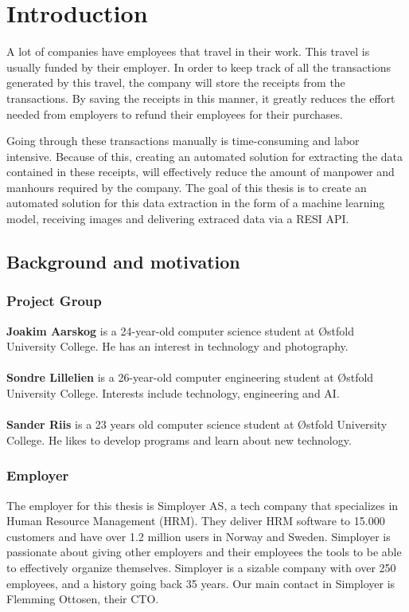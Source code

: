  \chapter{Introduction}
\label{ch:intro}
A lot of companies have employees that travel in their work.
This travel is usually funded by their employer.
In order to keep track of all the transactions generated by this travel, the company will store the receipts from the
transactions.
By saving the receipts in this manner, it greatly reduces the effort needed from employers to refund their employees
for their purchases.

Going through these transactions manually is time-consuming and labor intensive.
Because of this, creating an automated solution for extracting the data contained in these receipts, will effectively
reduce the amount of manpower and manhours required by the company.
The goal of this thesis is to create an automated solution for this data extraction in the form of a machine learning model, receiving images and delivering extraced data via a RESI API\@.
\section{Background and motivation}\label{sec:background-and-motivation}
\subsection{Project Group}\label{subsec:project-group}
\textbf{Joakim Aarskog} is a 24-year-old computer science student at Østfold University College.
He has an interest in technology and photography.\\
\\
\textbf{Sondre Lillelien} is a 26-year-old computer engineering student at Østfold University College.
Interests include technology, engineering and AI.\\
\\
\textbf{Sander Riis} is a 23 years old computer science student at Østfold University College.
He likes to develop programs and learn about new technology.

\subsection{Employer}\label{subsec:employer}
The employer for this thesis is Simployer AS, a tech company that specializes in Human Resource Management (HRM).
They deliver HRM software to 15.000 customers and have over 1.2 million users in Norway and Sweden.
Simployer is passionate about giving other employers and their employees the tools to be able to effectively organize themselves.
Simployer is a sizable company with over 250 employees, and a history going back 35 years.
Our main contact in Simployer is Flemming Ottosen, their CTO\@.

